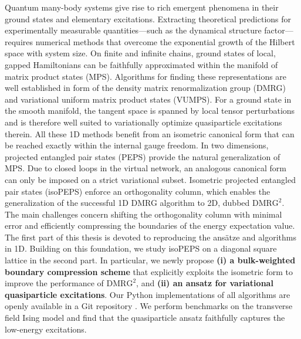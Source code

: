 Quantum many-body systems give rise to rich emergent phenomena in their ground states and elementary excitations. Extracting theoretical predictions for experimentally measurable quantities---such as the dynamical structure factor---requires numerical methods that overcome the exponential growth of the Hilbert space with system size. On finite and infinite chains, ground states of local, gapped Hamiltonians can be faithfully approximated within the manifold of matrix product states (MPS). Algorithms for finding these representations are well established in form of the density matrix renormalization group (DMRG) and variational uniform matrix product states (VUMPS). For a ground state in the smooth manifold, the tangent space is spanned by local tensor perturbations and is therefore well suited to variationally optimize quasiparticle excitations therein. All these 1D methods benefit from an isometric canonical form that can be reached exactly within the internal gauge freedom. 
In two dimensions, projected entangled pair states (PEPS) provide the natural generalization of MPS. Due to closed loops in the virtual network, an analogous canonical form can only be imposed on a strict variational subset. Isometric projected entangled pair states (isoPEPS) enforce an orthogonality column, which enables the generalization of the successful 1D DMRG algorithm to 2D, dubbed $\text{DMRG}^2$. The main challenges concern shifting the orthogonality column with minimal error and efficiently compressing the boundaries of the energy expectation value. 
The first part of this thesis is devoted to reproducing the ansätze and algorithms in 1D. Building on this foundation, we study isoPEPS on a diagonal square lattice in the second part. In particular, we newly propose \textbf{(i) a bulk-weighted boundary compression scheme} that explicitly exploits the isometric form to improve the performance of $\text{DMRG}^2$, and \textbf{(ii) an ansatz for variational quasiparticle excitations}. Our Python implementations of all algorithms are openly available in a Git repository \cite{wittmann2025iso}. We perform benchmarks on the transverse field Ising model and find that the quasiparticle ansatz faithfully captures the low-energy excitations.
